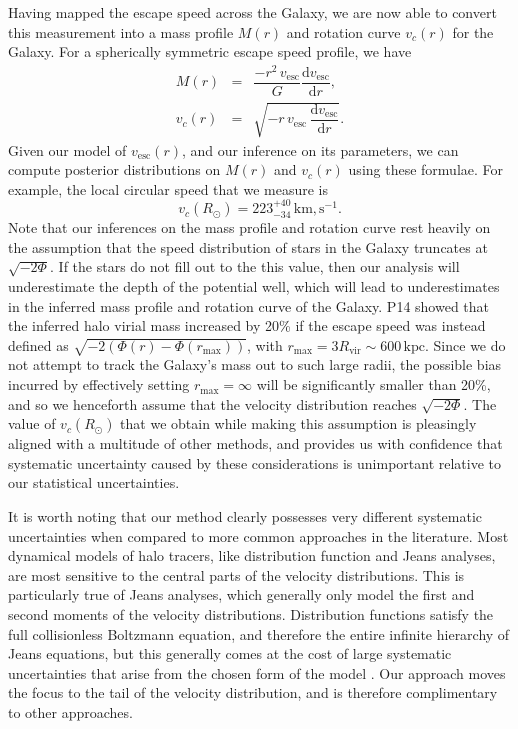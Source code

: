 \documentclass[useAMS,twocolumn,usenatbib]{mn2e}
\def\kpc{{\,\mathrm{kpc}}}
\def\km,s{{\,\mathrm{km,s^{-1}}}}
\def\vesc{{v_\mathrm{esc}}}
\begin{document}
Having mapped the escape speed across the Galaxy, we are now able to convert this measurement into a mass profile $M(r)$ and rotation curve $v_c(r)$ for the Galaxy. 
For a spherically symmetric escape speed profile, we have
%
\begin{eqnarray}
M(r) &=& \dfrac{-r^2\,\vesc}{G}\dfrac{\mathrm{d}\vesc}{\mathrm{d}r}, \label{eq:mass}\\
v_c(r) &=& \sqrt{-r\,\vesc\,\dfrac{\mathrm{d}\vesc}{\mathrm{d}r}}. \label{eq:circspeed}
\end{eqnarray}
%
Given our model of $\vesc(r)$, and our inference on its parameters, we can compute posterior distributions on $M(r)$ and $v_c(r)$ using these formulae.
For example, the local circular speed that we measure is
%
\begin{equation}
v_c(R_\odot) = 223^{+40}_{-34}\km,s.
\end{equation}
%
Note that our inferences on the mass profile and rotation curve rest heavily on the assumption that the speed distribution of stars in the Galaxy truncates at $\sqrt{-2\Phi}$.
If the stars do not fill out to the this value, then our analysis will underestimate the depth of the potential well, which will lead to underestimates in the inferred mass profile and rotation curve of the Galaxy.
P14 showed that the inferred halo virial mass increased by 20\% if the escape speed was instead defined as $\sqrt{-2\left(\Phi(r) - \Phi(r_\mathrm{max})\right)}$, with $r_\mathrm{max} = 3R_\mathrm{vir} \sim 600\kpc$.
Since we do not attempt to track the Galaxy's mass out to such large radii, the possible bias incurred by effectively setting $r_\mathrm{max} = \infty$ will be significantly smaller than 20\%, and so we henceforth assume that the velocity distribution reaches $\sqrt{-2\Phi}$.
The value of $v_c(R_\odot)$ that we obtain while making this assumption is pleasingly aligned with a multitude of other methods, and provides us with confidence that systematic uncertainty caused by these considerations is unimportant relative to our statistical uncertainties.

It is worth noting that our method clearly possesses very different systematic uncertainties when compared to more common approaches in the literature.
Most dynamical models of halo tracers, like distribution function and Jeans analyses, are most sensitive to the central parts of the velocity distributions.
This is particularly true of Jeans analyses, which generally only model the first and second moments of the velocity distributions. 
Distribution functions satisfy the full collisionless Boltzmann equation, and therefore the entire infinite hierarchy of Jeans equations, but this generally comes at the cost of large systematic uncertainties that arise from the chosen form of the model \citep{Wa15}.  
Our approach moves the focus to the tail of the velocity distribution, and is therefore complimentary to other approaches.
\end{document}
